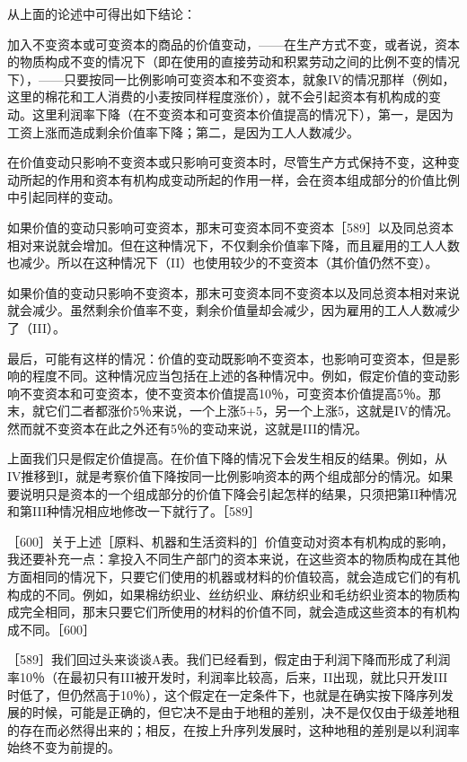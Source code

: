 从上面的论述中可得出如下结论：

加入不变资本或可变资本的商品的价值变动，——在生产方式不变，或者说，资本的物质构成不变的情况下（即在使用的直接劳动和积累劳动之间的比例不变的情况下），——只要按同一比例影响可变资本和不变资本，就象IV的情况那样（例如，这里的棉花和工人消费的小麦按同样程度涨价），就不会引起资本有机构成的变动。这里利润率下降（在不变资本和可变资本价值提高的情况下），第一，是因为工资上涨而造成剩余价值率下降；第二，是因为工人人数减少。

在价值变动只影响不变资本或只影响可变资本时，尽管生产方式保持不变，这种变动所起的作用和资本有机构成变动所起的作用一样，会在资本组成部分的价值比例中引起同样的变动。

如果价值的变动只影响可变资本，那末可变资本同不变资本［589］以及同总资本相对来说就会增加。但在这种情况下，不仅剩余价值率下降，而且雇用的工人人数也减少。所以在这种情况下（II）也使用较少的不变资本（其价值仍然不变）。

如果价值的变动只影响不变资本，那末可变资本同不变资本以及同总资本相对来说就会减少。虽然剩余价值率不变，剩余价值量却会减少，因为雇用的工人人数减少了（III）。

最后，可能有这样的情况：价值的变动既影响不变资本，也影响可变资本，但是影响的程度不同。这种情况应当包括在上述的各种情况中。例如，假定价值的变动影响不变资本和可变资本，使不变资本价值提高10％，可变资本价值提高5％。那末，就它们二者都涨价5％来说，一个上涨5+5，另一个上涨5，这就是IV的情况。然而就不变资本在此之外还有5％的变动来说，这就是III的情况。

上面我们只是假定价值提高。在价值下降的情况下会发生相反的结果。例如，从IV推移到I，就是考察价值下降按同一比例影响资本的两个组成部分的情况。如果要说明只是资本的一个组成部分的价值下降会引起怎样的结果，只须把第II种情况和第III种情况相应地修改一下就行了。［589］


［600］关于上述［原料、机器和生活资料的］价值变动对资本有机构成的影响，我还要补充一点：拿投入不同生产部门的资本来说，在这些资本的物质构成在其他方面相同的情况下，只要它们使用的机器或材料的价值较高，就会造成它们的有机构成的不同。例如，如果棉纺织业、丝纺织业、麻纺织业和毛纺织业资本的物质构成完全相同，那末只要它们所使用的材料的价值不同，就会造成这些资本的有机构成不同。［600］


［589］我们回过头来谈谈A表。我们已经看到，假定由于利润下降而形成了利润率10％（在最初只有III被开发时，利润率比较高，后来，II出现，就比只开发III时低了，但仍然高于10％），这个假定在一定条件下，也就是在确实按下降序列发展的时候，可能是正确的，但它决不是由于地租的差别，决不是仅仅由于级差地租的存在而必然得出来的；相反，在按上升序列发展时，这种地租的差别是以利润率始终不变为前提的。

